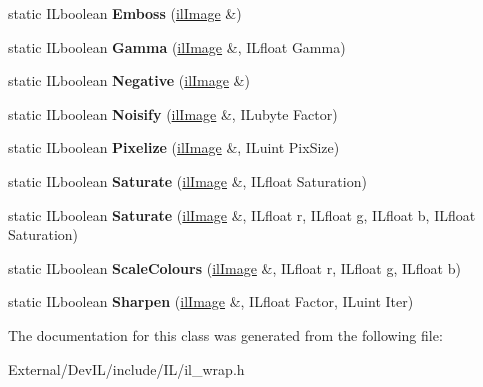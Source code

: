 \begin{DoxyCompactItemize}
\item 
\hypertarget{classilFilters_a2fd5e100856cd8295cfbabf36c5d9cce}{
static ILboolean {\bfseries Emboss} (\hyperlink{classilImage}{ilImage} \&)}
\label{classilFilters_a2fd5e100856cd8295cfbabf36c5d9cce}

\item 
\hypertarget{classilFilters_a6dd6b152a3cd471042a8bc38d0bc7a7e}{
static ILboolean {\bfseries Gamma} (\hyperlink{classilImage}{ilImage} \&, ILfloat Gamma)}
\label{classilFilters_a6dd6b152a3cd471042a8bc38d0bc7a7e}

\item 
\hypertarget{classilFilters_a3d20636ac4a2dc7011c40198931a89b5}{
static ILboolean {\bfseries Negative} (\hyperlink{classilImage}{ilImage} \&)}
\label{classilFilters_a3d20636ac4a2dc7011c40198931a89b5}

\item 
\hypertarget{classilFilters_aa14d0e50776475624375fc30f226d6fa}{
static ILboolean {\bfseries Noisify} (\hyperlink{classilImage}{ilImage} \&, ILubyte Factor)}
\label{classilFilters_aa14d0e50776475624375fc30f226d6fa}

\item 
\hypertarget{classilFilters_a29550c3adab5f3e24283bb650f67911c}{
static ILboolean {\bfseries Pixelize} (\hyperlink{classilImage}{ilImage} \&, ILuint PixSize)}
\label{classilFilters_a29550c3adab5f3e24283bb650f67911c}

\item 
\hypertarget{classilFilters_ac2ca65e50864dcd6375412bd4fcd5616}{
static ILboolean {\bfseries Saturate} (\hyperlink{classilImage}{ilImage} \&, ILfloat Saturation)}
\label{classilFilters_ac2ca65e50864dcd6375412bd4fcd5616}

\item 
\hypertarget{classilFilters_a7af968f4b03f426cdfa31792addbd2ca}{
static ILboolean {\bfseries Saturate} (\hyperlink{classilImage}{ilImage} \&, ILfloat r, ILfloat g, ILfloat b, ILfloat Saturation)}
\label{classilFilters_a7af968f4b03f426cdfa31792addbd2ca}

\item 
\hypertarget{classilFilters_a3df1598d6184b8d0e06514c11cab603a}{
static ILboolean {\bfseries ScaleColours} (\hyperlink{classilImage}{ilImage} \&, ILfloat r, ILfloat g, ILfloat b)}
\label{classilFilters_a3df1598d6184b8d0e06514c11cab603a}

\item 
\hypertarget{classilFilters_a9baffa0bea289a992575a98350851012}{
static ILboolean {\bfseries Sharpen} (\hyperlink{classilImage}{ilImage} \&, ILfloat Factor, ILuint Iter)}
\label{classilFilters_a9baffa0bea289a992575a98350851012}

\end{DoxyCompactItemize}


The documentation for this class was generated from the following file:\begin{DoxyCompactItemize}
\item 
External/DevIL/include/IL/il\_\-wrap.h\end{DoxyCompactItemize}
